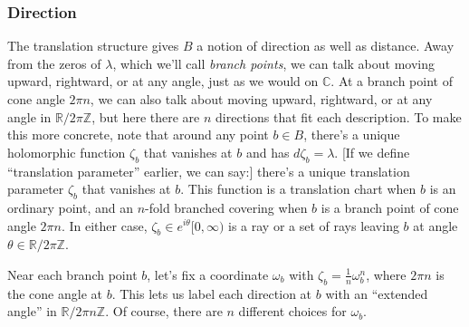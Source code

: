 \documentclass{article}
\newcommand{\Z}{\mathbb{Z}}
\newcommand{\R}{\mathbb{R}}
\newcommand{\C}{\mathbb{C}}
\theoremstyle{definition}
\theoremstyle{plain}
\begin{document}
\subsubsection{Direction}\label{transl:dir}
%
The translation structure gives $B$ a notion of direction as well as distance. Away from the zeros of $\lambda$, which we'll call {\em branch points}, we can talk about moving upward, rightward, or at any angle, just as we would on $\C$. At a branch point of cone angle $2\pi n$, we can also talk about moving upward, rightward, or at any angle in $\R/2\pi\Z$, but here there are $n$ directions that fit each description. To make this more concrete, note that around any point $b \in B$, there's a unique holomorphic function $\zeta_b$ that vanishes at $b$ and has $d\zeta_b = \lambda$. \textcolor{VioletRed}{[If we define ``translation parameter'' earlier, we can say:] there's a unique translation parameter $\zeta_b$ that vanishes at $b$.} This function is a translation chart when $b$ is an ordinary point, and an $n$-fold branched covering when $b$ is a branch point of cone angle $2\pi n$. In either case, $\zeta_b \in e^{i\theta} [0, \infty)$ is a ray or a set of rays leaving $b$ at angle $\theta \in \R/2\pi\Z$.
%

Near each branch point $b$, let's fix a coordinate $\omega_b$ with $\zeta_b = \tfrac{1}{n} \omega_b^n$, where $2\pi n$ is the cone angle at $b$. This lets us label each direction at $b$ with an ``extended angle'' in $\R/2\pi n\Z$. Of course, there are $n$ different choices for $\omega_b$.
%
\end{document}
